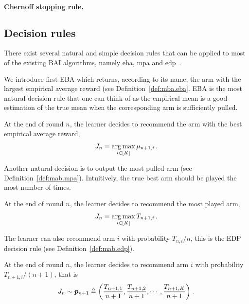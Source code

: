 \paragraph{Chernoff stopping rule.}

\subsection{Decision rules}\label{sec:mab.bai.decision}

There exist several natural and simple decision rules that can be applied to most of the existing BAI algorithms, namely \gls{eba}, \gls{mpa} and \gls{edp}~\citep{bubeck2009pure}.

We introduce first EBA which returns, according to its name, the arm with the largest empirical average reward (see Definition~\ref{def:mba.eba}. EBA is the most natural decision rule that one can think of as the empirical mean is a good estimation of the true mean when the corresponding arm is sufficiently pulled.

\begin{definition}
\begin{leftbar}[defnbar]\label{def:mba.eba}
    At the end of round $n$, the learner decides to recommend the arm with the best empirical average reward,
    \[
        J_n = \operatorname*{arg\,max}_{i\in[K]} \mu_{n+1,i}\,.
    \]
\end{leftbar}
\end{definition}

Another natural decision is to output the most pulled arm (see Definition~\ref{def:mab.mpa}). Intuitively, the true best arm should be played the most number of times.

\begin{definition}
\begin{leftbar}[defnbar]\label{def:mab.mpa}
    At the end of round $n$, the learner decides to recommend the most played arm,
    \[
        J_n = \operatorname*{arg\,max}_{i\in[K]} T_{n+1,i}\,.
    \]
\end{leftbar}
\end{definition}

The learner can also recommend arm $i$ with probability $T_{n,i}/n$, this is the EDP decision rule (see Definition~\ref{def:mab.edp}).

\begin{definition}
\begin{leftbar}[defnbar]\label{def:mab.edp}
    At the end of round $n$, the learner decides to recommend arm $i$ with probability $T_{n+1,i}/(n+1)$, that is
    \[
        J_n \sim \boldsymbol{p}_{n+1}\triangleq\left(\frac{T_{n+1,1}}{n+1},\frac{T_{n+1,2}}{n+1},\cdots,\frac{T_{n+1,K}}{n+1}\right)\,.
    \]
\end{leftbar}
\end{definition}

